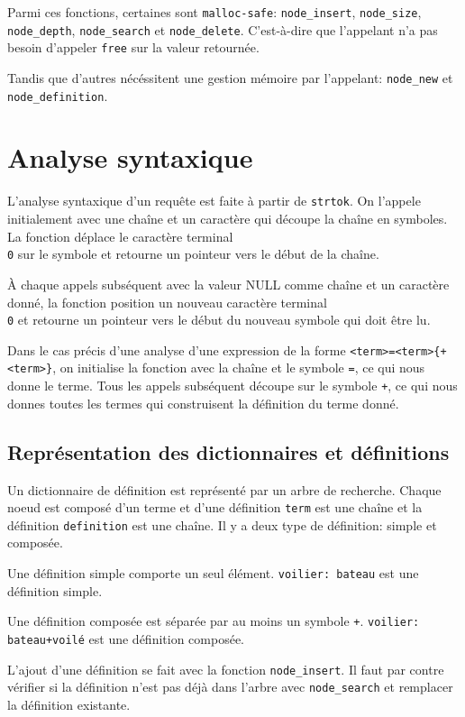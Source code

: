 \documentclass{article}
\begin{document}
Parmi ces fonctions, certaines sont \texttt{malloc-safe}: \texttt{node\_insert},
\texttt{node\_size}, \texttt{node\_depth}, \texttt{node\_search} et
\texttt{node\_delete}. C'est-à-dire que l'appelant n'a pas
besoin d'appeler \texttt{free} sur la valeur retournée.

Tandis que d'autres nécéssitent une gestion mémoire par l'appelant:
\texttt{node\_new} et \texttt{node\_definition}.

\section{Analyse syntaxique}
L'analyse syntaxique d'un requête est faite à partir de \texttt{strtok}. On
l'appele initialement avec une chaîne et un caractère qui découpe la chaîne en
symboles. La fonction déplace le caractère terminal \texttt{\\0} sur le symbole
et retourne un pointeur vers le début de la chaîne.

À chaque appels subséquent avec la valeur NULL comme chaîne et un caractère
donné, la fonction position un nouveau caractère terminal \texttt{\\0} et
retourne un pointeur vers le début du nouveau symbole qui doit être lu.

Dans le cas précis d'une analyse d'une expression de la forme
\texttt{<term>=<term>\{+<term>\}}, on initialise la fonction avec la
chaîne et le symbole \texttt{=}, ce qui nous donne le terme. Tous les appels
subséquent découpe sur le symbole \texttt{+}, ce qui nous donnes toutes les
termes qui construisent la définition du terme donné.

\subsection{Représentation des dictionnaires et définitions}
Un dictionnaire de définition est représenté par un arbre de recherche. Chaque
noeud est composé d'un terme et d'une définition \texttt{term} est une chaîne et
la définition \texttt{definition} est une chaîne. Il y a deux type de
définition: simple et composée.

Une définition simple comporte un seul élément. \texttt{voilier: bateau} est une
définition simple.

Une définition composée est séparée par au moins un symbole \texttt{+}.
\texttt{voilier: bateau+voilé} est une définition composée.

L'ajout d'une définition se fait avec la fonction \texttt{node\_insert}. Il faut
par contre vérifier si la définition n'est pas déjà dans l'arbre avec
\texttt{node\_search} et remplacer la définition existante.
\end{document}
